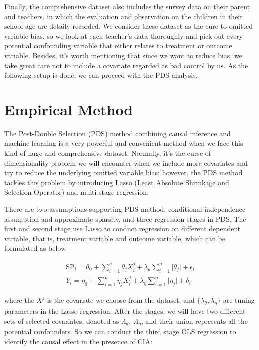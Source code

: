 \documentclass[]{AEA}
\begin{document}
\begin{figure}
    \end{figure}

    Finally, the comprehensive dataset also includes the survey data on their parent and teachers, in which the evaluation and observation on the children in their school age are detaily recorded.  We consider these dataset as the cure to omitted variable bias, so we look at each teacher's data thoroughly and pick out every potential confounding variable that either relates to treatment or outcome variable.  Besides, it's worth mentioning that since we want to reduce bias, we take great care not to include a covariate regarded as bad control by us.  As the following setup is done, we can proceed with the PDS analysis.


\section{Empirical Method} %

    The Post-Double Selection (PDS) method combining causal inference and machine learning is a very powerful and convenient method when we face this kind of huge and comprehensive dataset.  Normally, it's the curse of dimensionality problem we will encounter when we include more covariates and try to reduce the underlying omitted variable bias; however, the PDS method tackles this problem by introducing Lasso (Least Absolute Shrinkage and Selection Operator) and multi-stage regression.

    There are two assumptions supporting PDS method: conditional independence assumption and approximate sparsity, and three regression stages in PDS.  The first and second stage use Lasso to conduct regression on different dependent variable, that is, treatment variable and outcome variable, which can be formulated as below

    \begin{align}
    \text{SP}_i = \theta_0 + \sum_{i=1}^n \theta_j X_i^j + \lambda_\theta\sum_{i=1}^n \lvert \theta_j \rvert + \epsilon_i \\
    Y_i         = \eta_0   + \sum_{i=1}^n \eta_j X_i^j   + \lambda_\eta\sum_{i=1}^n \lvert \eta_j   \rvert + \delta_i
    \end{align}

    where the $X^j$ is the covariate we choose from the dataset, and $\{\lambda_\theta,\lambda_\eta\}$ are tuning parameters in the Lasso regression.  After the stages, we will have two different sets of selected covariates, denoted as $\Lambda_\theta,\ \Lambda_\eta$, and their union represents all the potential confounders.  So we can conduct the third stage OLS regression to identify the causal effect in the presence of CIA:
\end{document}
